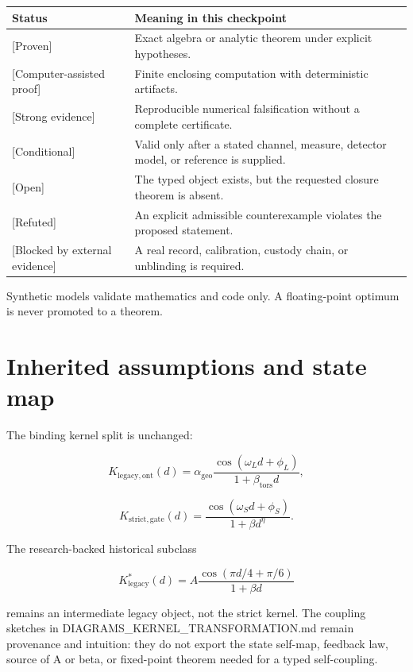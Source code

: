 \documentclass[11pt,a4paper,openany]{report}
\newcommand{\statusProven}{\textcolor{fingreen}{[Proven]}}
\newcommand{\statusStrong}{\textcolor{finblue}{[Strong evidence]}}
\newcommand{\statusRefuted}{\textcolor{finred}{[Refuted]}}
\begin{document}
\begin{center}
\begingroup\small
\setlength{\tabcolsep}{2.5pt}
\renewcommand{\arraystretch}{1.16}
\begin{longtable}{@{}p{}p{}@{}}
\toprule
\textbf{Status} & \textbf{Meaning in this checkpoint} \\
\midrule
\endhead
\statusProven{} & Exact algebra or analytic theorem under explicit hypotheses. \\
\textcolor{fingreen}{[Computer-assisted proof]} & Finite enclosing computation with deterministic artifacts. \\
\statusStrong{} & Reproducible numerical falsification without a complete certificate. \\
\textcolor{finviolet}{[Conditional]} & Valid only after a stated channel, measure, detector model, or reference is supplied. \\
\textcolor{finorange}{[Open]} & The typed object exists, but the requested closure theorem is absent. \\
\statusRefuted{} & An explicit admissible counterexample violates the proposed statement. \\
\textcolor{finred}{[Blocked by external evidence]} & A real record, calibration, custody chain, or unblinding is required. \\
\bottomrule
\end{longtable}
\endgroup
\end{center}

Synthetic models validate mathematics and code only. A floating-point optimum is never promoted to a theorem.

\chapter{Inherited assumptions and state map}

The binding kernel split is unchanged:

\[
K_{\mathrm{legacy,ont}}(d)
=\alpha_{\mathrm{geo}}
\frac{\cos(\omega_Ld+\phi_L)}{1+\beta_{\mathrm{tors}}d},
\]

\[
K_{\mathrm{strict,gate}}(d)
=\frac{\cos(\omega_Sd+\phi_S)}{1+\beta d^\eta}.
\]

The research-backed historical subclass

\[
K^*_{\mathrm{legacy}}(d)
=A\frac{\cos(\pi d/4+\pi/6)}{1+\beta d}
\]

remains an intermediate legacy object, not the strict kernel. The coupling sketches in DIAGRAMS\_KERNEL\_TRANSFORMATION.md remain provenance and intuition: they do not export the state self-map, feedback law, source of A or beta, or fixed-point theorem needed for a typed self-coupling.
\end{document}
